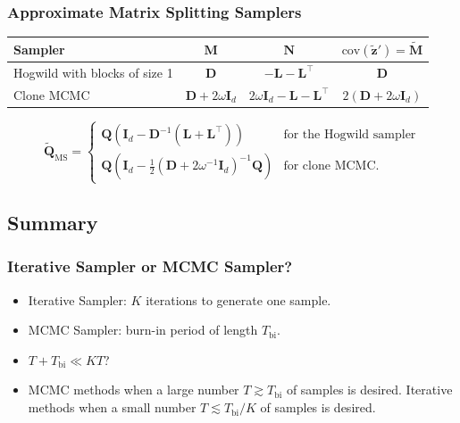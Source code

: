 \documentclass[aspectratio=169]{beamer}
\newcommand{\B}[1]{\mathbf{#1}} %
\newcommand{\pr}[1]{\left(#1\right)} %
\begin{document}
\begin{frame}
\frametitle{Approximate Matrix Splitting Samplers}
\begin{table}
{
\begin{center}
{\renewcommand{\arraystretch}{1.5}
\begin{tabular}{|l|c|c|c|} 
  \hline
  \textbf{Sampler} & $\B{M}$ & $\B{N}$ & $\text{cov}(\tilde{\B{z}}') = \tilde{\B{M}}$ \\
  \hline 
  Hogwild with blocks of size 1 & $\B{D}$ & $-\B{L} - \B{L}^{\top}$ & $\B{D}$ \\ 
  Clone MCMC & $\B{D} + 2\omega\B{I}_d$ & $2\omega\B{I}_d -\B{L} - \B{L}^{\top}$ & $2\pr{\B{D}+ 2\omega\B{I}_d}$\\[0.3em]
  \hline
\end{tabular}}
\end{center}
}
\end{table}
\[
\widetilde{\B{Q}}_{\text{MS}} =
\begin{cases}
\B{Q}\pr{\B{I}_d - \B{D}^{-1}(\B{L}+\B{L}^{\top})} & \text{for the Hogwild sampler}\\
\B{Q}\pr{\B{I}_d - \frac{1}{2}(\B{D} + 2\omega^{-1}\B{I}_d)^{-1}\B{Q}} & \text{for clone MCMC.}
\end{cases}    \]
\end{frame}

\subsection{Summary}
\begin{frame}
\frametitle{Iterative Sampler or MCMC Sampler?}
\begin{itemize}
\item Iterative Sampler: $K$ iterations to generate one sample. 
\item MCMC Sampler: burn-in period of length $T_{\text{bi}}$.
\item $T + T_{\text{bi}} \ll KT$?
\item MCMC methods when a large number $T\gtrsim T_{\text{bi}}$ of samples is desired. Iterative methods when a small number $T\lesssim T_{\text{bi}}/K$ of samples is desired.
\end{itemize}
\end{frame}
\end{document}
